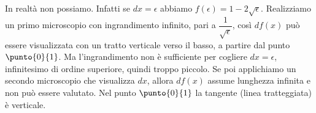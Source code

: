 \begin{esempio}
\begin{inaccessibleblock}
 \begin{center}
 \begin{minipage}[]{.45 \textwidth}
  \derivaradiceinzero
 \end{minipage} 
 \hfill
 \begin{minipage}[]{.50 \textwidth}
\vspace{-2em}
In realtà non possiamo. Infatti se $dx=\epsilon$ abbiamo 
$f(\epsilon)=1-2\sqrt{\epsilon}$.
Realizziamo un primo microscopio con ingrandimento infinito, pari a 
$\dfrac{1}{\sqrt{\epsilon}}$, così $df(x)$ può essere visualizzata con un 
tratto verticale verso il basso, a partire dal punto $\punto{0}{1}$. Ma 
l'ingrandimento non è sufficiente per cogliere $dx=\epsilon$,  
infinitesimo di ordine superiore, quindi troppo piccolo.
Se poi applichiamo un secondo microscopio che visualizza $dx$, allora 
$df(x)$
assume lunghezza infinita e non può essere valutato. Nel punto 
$\punto{0}{1}$
la tangente (linea tratteggiata) è verticale.
\end{minipage}
\end{center}
\end{inaccessibleblock}
\label{}
\end{esempio}

